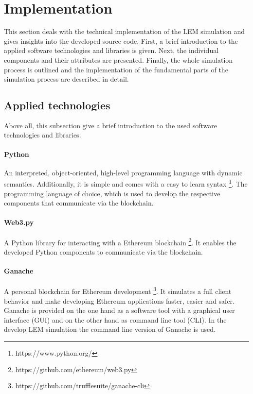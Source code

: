\section{Implementation}
\label{sec:implementation}

This section deals with the technical implementation of the LEM simulation
and gives insights into the developed source code.
First, a brief introduction to the applied software 
technologies and libraries is given.
Next, the individual components and their attributes are presented. 
Finally, the whole simulation process is outlined and the 
implementation of the fundamental parts 
of the simulation process are described in detail. 

\subsection{Applied technologies}
\label{sec:applied_technologies}
Above all, this subsection give a brief introduction to the used software technologies and libraries.

\paragraph{Python}
An interpreted, object-oriented, high-level programming 
language with dynamic semantics. Additionally, it is simple and 
comes with a easy to learn syntax \footnote{https://www.python.org/}.
The programming language of choice, which is used to develop the 
respective components that communicate via the blockchain.

\paragraph{Web3.py}
A Python library for interacting with a Ethereum blockchain \footnote{https://github.com/ethereum/web3.py}. 
It enables the developed Python components to communicate via the blockchain.

\paragraph{Ganache}
A personal blockchain for Ethereum development \footnote{https://github.com/trufflesuite/ganache-cli}.
It simulates a full client behavior and make developing Ethereum applications faster, easier and safer.
Ganache is provided on the one hand as a software tool with a graphical user interface (GUI) and 
on the other hand as command line tool (CLI). In the develop LEM simulation the command line version 
of Ganache is used. 


